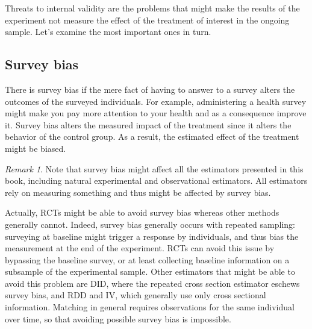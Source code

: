 \documentclass[
]{book}
\theoremstyle{definition}
\theoremstyle{definition}
\theoremstyle{definition}
\theoremstyle{definition}
\theoremstyle{remark}
\newtheorem*{remark}{Remark}
\begin{document}
Threats to internal validity are the problems that might make the results of the experiment not measure the effect of the treatment of interest in the ongoing sample.
Let's examine the most important ones in turn.

\hypertarget{survey-bias}{%
\subsection{Survey bias}\label{survey-bias}}

There is survey bias if the mere fact of having to answer to a survey alters the outcomes of the surveyed individuals.
For example, administering a health survey might make you pay more attention to your health and as a consequence improve it.
Survey bias alters the measured impact of the treatment since it alters the behavior of the control group.
As a result, the estimated effect of the treatment might be biased.

\begin{remark}
\iffalse{} {Remark. } \fi{}Note that survey bias might affect all the estimators presented in this book, including natural experimental and observational estimators.
All estimators rely on measuring something and thus might be affected by survey bias.

Actually, RCTs might be able to avoid survey bias whereas other methods generally cannot.
Indeed, survey bias generally occurs with repeated sampling: surveying at baseline might trigger a response by individuals, and thus bias the measurement at the end of the experiment.
RCTs can avoid this issue by bypassing the baseline survey, or at least collecting baseline information on a subsample of the experimental sample.
Other estimators that might be able to avoid this problem are DID, where the repeated cross section estimator eschews survey bias, and RDD and IV, which generally use only cross sectional information.
Matching in general requires observations for the same individual over time, so that avoiding possible survey bias is impossible.
\end{remark}
\end{document}
